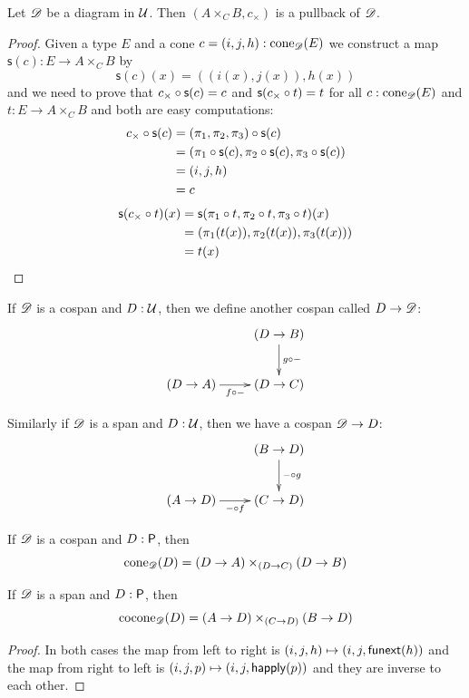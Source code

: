 \begin{lem}
  Let $\Ddiag$ be a diagram in $\type$. Then $(A\times_CB,c_\times)$ is a
  pullback of $\Ddiag$.
\end{lem}
\begin{proof}
  Given a type $E$ and a cone $c=(i,j,h):\cone{\Ddiag}{E}$ we construct a map
  $\mathsf{s}(c):E\to{}A\times_CB$ by
  \[\mathsf{s}(c)(x)=((i(x), j(x)), h(x))\]
  and we need to prove that $\composecone{\mathsf{s}(c)}{c_\times}=c$ and
  $\mathsf{s}(\composecone{t}{c_\times})=t$ for all $c:\cone{\Ddiag}{E}$ and
  $t:E\to{}A\times_CB$ and both are easy computations:
  \begin{align*}
    \composecone{\mathsf{s}(c)}{c_\times}
    &=\composecone{\mathsf{s}(c)}{(\pi_1,\pi_2,\pi_3)} \\
    &=(\pi_1\circ\mathsf{s}(c),\pi_2\circ\mathsf{s}(c),
    \pi_3\circ\mathsf{s}(c))\\
    &=(i,j,h)\\
    &=c
  \end{align*}
  \begin{align*}
    \mathsf{s}(\composecone{t}{c_\times})(x) &=
    \mathsf{s}(\pi_1\circ{}t,\pi_2\circ{}t,\pi_3\circ{}t)(x)\\
    &=(\pi_1(t(x)),\pi_2(t(x)),\pi_3(t(x)))\\
    &=t(x)\qedhere
  \end{align*}
\end{proof}

\begin{defn}
  If $\Ddiag$ is a cospan and $D:\type$, then we define another
  cospan called $D\to\Ddiag$:
  \[\xymatrix{& (D\to B) \ar^{g\circ-}[d] \\ (D\to A) \ar_{f\circ-}[r] & (D\to
    C)}\]

  Similarly if $\Ddiag$ is a span and $D:\type$, then we have a
  cospan $\Ddiag\to{}D$:
  \[\xymatrix{& (B\to D) \ar^{-\circ{}g}[d] \\ (A\to D) \ar_{-\circ{}f}[r] &
    (C\to D)}\]
\end{defn}

\begin{lem}
  \label{coneispb}
  If $\Ddiag$ is a cospan and $D:\P$, then
  \[\cone{\Ddiag}{D}=(D\to{}A)\times_{(D\to{}C)}(D\to{}B)\]

  If $\Ddiag$ is a span and $D:\P$, then
  \[\cocone{\Ddiag}{D}=(A\to{}D)\times_{(C\to{}D)}(B\to{}D)\]
\end{lem}
\begin{proof}
  In both cases the map from left to right is $(i,j,h)\mapsto(i,j,\funext(h))$
  and the map from right to left is $(i,j,p)\mapsto(i,j,\happly(p))$ and they
  are inverse to each other.
\end{proof}

